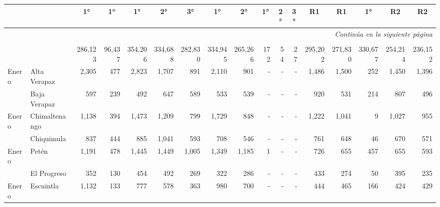 \begin{landscape}
\begin{center}
\begin{longtable}{llrrrrrrrrrrrrrrr}
			\multicolumn{1}{c}{ }&\multicolumn{1}{c}{ }&	\multicolumn{1}{c}{1°}&		\multicolumn{1}{c}{1°}&		\multicolumn{1}{c}{1°}&		\multicolumn{1}{c}{2°}&		\multicolumn{1}{c}{3°}&		\multicolumn{1}{c}{1°}&		\multicolumn{1}{c}{2°}&		\multicolumn{1}{c}{1°}&		\multicolumn{1}{c}{2°}&		\multicolumn{1}{c}{3°}&		\multicolumn{1}{c}{R1}&		\multicolumn{1}{c}{R1}&		\multicolumn{1}{c}{1°}&	\multicolumn{1}{c}{R2}&		\multicolumn{1}{c}{R2}	\\\hline\endhead
						\hline \multicolumn{17}{r}{\textit{Continúa en la siguiente página}} \\
						\endfoot
						\hline \multicolumn{17}{l}{\textbf{Fuente:}\textit{SIGSA}} \\\endlastfoot
			\rowcolor{color1!40!white} \multicolumn{1}{l}{\Bold{	\footnotesize	 Total 	}}&		&	 286,123 	&	 96,437 	&	 354,206 	&	 334,688 	&	 282,830 	&	 334,945 	&	 265,266 	&	 172 	&	 54 	&	 27 	&	 295,202 	&	 271,830 	&	 330,677 	&	 254,214 	&	 236,152 	\\
			\multicolumn{1}{l}{	\footnotesize	 Enero 	}&	 Alta Verapaz 	&	 2,305 	&	 477 	&	 2,823 	&	 1,707 	&	 891 	&	 2,110 	&	 901 	&	 -   	&	 -   	&	 -   	&	 1,486 	&	 1,500 	&	 252 	&	 1,450 	&	 1,396 	\\
			\rowcolor{color1!5!white}\multicolumn{1}{l}{	\footnotesize	 Enero 	}&	 Baja Verapaz 	&	 597 	&	 239 	&	 492 	&	 647 	&	 589 	&	 533 	&	 539 	&	 -   	&	 -   	&	 -   	&	 920 	&	 531 	&	 214 	&	 807 	&	 496 	\\
			\multicolumn{1}{l}{	\footnotesize	 Enero 	}&	 Chimaltenango 	&	 1,138 	&	 394 	&	 1,473 	&	 1,209 	&	 799 	&	 1,729 	&	 848 	&	 -   	&	 -   	&	 -   	&	 1,222 	&	 1,041 	&	 9 	&	 1,027 	&	 955 	\\
			\rowcolor{color1!5!white}\multicolumn{1}{l}{	\footnotesize	 Enero 	}&	 Chiquimula 	&	 837 	&	 444 	&	 885 	&	 1,041 	&	 593 	&	 708 	&	 546 	&	 -   	&	 -   	&	 -   	&	 761 	&	 648 	&	 46 	&	 670 	&	 571 	\\
			\multicolumn{1}{l}{	\footnotesize	 Enero 	}&	 Petén 	&	 1,191 	&	 478 	&	 1,445 	&	 1,449 	&	 1,005 	&	 1,349 	&	 1,185 	&	 1 	&	 -   	&	 -   	&	 726 	&	 655 	&	 457 	&	 655 	&	 593 	\\
			\rowcolor{color1!5!white}\multicolumn{1}{l}{	\footnotesize	 Enero 	}&	 El Progreso 	&	 352 	&	 130 	&	 454 	&	 492 	&	 269 	&	 322 	&	 286 	&	 -   	&	 -   	&	 -   	&	 433 	&	 274 	&	 50 	&	 395 	&	 235 	\\
			\multicolumn{1}{l}{	\footnotesize	 Enero 	}&	 Escuintla 	&	 1,132 	&	 133 	&	 777 	&	 578 	&	 363 	&	 980 	&	 700 	&	 -   	&	 -   	&	 -   	&	 444 	&	 465 	&	 166 	&	 424 	&	 429 	\\

\end{longtable}
\end{center}
\end{landscape}
